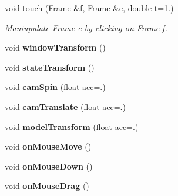 \begin{DoxyCompactItemize}
\item 
\hypertarget{classvsr_1_1_interface_ab2367f510538dbca24b51fa67d91fc78}{void \hyperlink{classvsr_1_1_interface_ab2367f510538dbca24b51fa67d91fc78}{touch} (\hyperlink{classvsr_1_1_frame}{Frame} \&f, \hyperlink{classvsr_1_1_frame}{Frame} \&e, double t=1.)}\label{classvsr_1_1_interface_ab2367f510538dbca24b51fa67d91fc78}

\begin{DoxyCompactList}\small\item\em Maniupulate \hyperlink{classvsr_1_1_frame}{Frame} e by clicking on \hyperlink{classvsr_1_1_frame}{Frame} f. \end{DoxyCompactList}\item 
\hypertarget{classvsr_1_1_interface_ae904ec6808d74ac401a3212a65e4a5e6}{void {\bfseries window\-Transform} ()}\label{classvsr_1_1_interface_ae904ec6808d74ac401a3212a65e4a5e6}

\item 
\hypertarget{classvsr_1_1_interface_a129dc1e9a086484fb64c58f5c70fd8cf}{void {\bfseries state\-Transform} ()}\label{classvsr_1_1_interface_a129dc1e9a086484fb64c58f5c70fd8cf}

\item 
\hypertarget{classvsr_1_1_interface_a43efbc868693c604c1a2d269947b993a}{void {\bfseries cam\-Spin} (float acc=.)}\label{classvsr_1_1_interface_a43efbc868693c604c1a2d269947b993a}

\item 
\hypertarget{classvsr_1_1_interface_a602401dc9b399a2276de6d82f973633f}{void {\bfseries cam\-Translate} (float acc=.)}\label{classvsr_1_1_interface_a602401dc9b399a2276de6d82f973633f}

\item 
\hypertarget{classvsr_1_1_interface_a6de59e9c8d4c8f55196913ccb6300c4a}{void {\bfseries model\-Transform} (float acc=.)}\label{classvsr_1_1_interface_a6de59e9c8d4c8f55196913ccb6300c4a}

\item 
\hypertarget{classvsr_1_1_interface_a872666e1d4c4718dbb399c939a9ef0b9}{void {\bfseries on\-Mouse\-Move} ()}\label{classvsr_1_1_interface_a872666e1d4c4718dbb399c939a9ef0b9}

\item 
\hypertarget{classvsr_1_1_interface_aef7c538e043ed751583bd912b4ac9e98}{void {\bfseries on\-Mouse\-Down} ()}\label{classvsr_1_1_interface_aef7c538e043ed751583bd912b4ac9e98}

\item 
\hypertarget{classvsr_1_1_interface_a514c5a97163ce16f713f09179e6c0596}{void {\bfseries on\-Mouse\-Drag} ()}\label{classvsr_1_1_interface_a514c5a97163ce16f713f09179e6c0596}


\end{DoxyCompactItemize}
